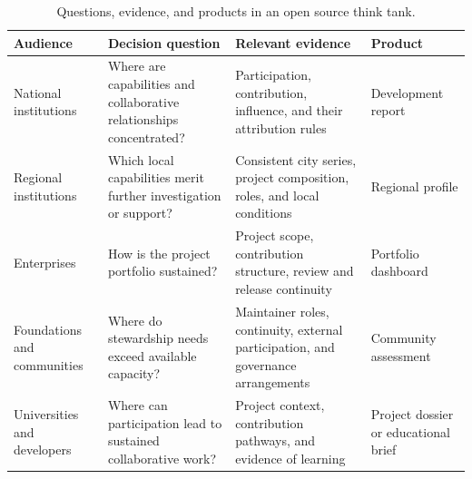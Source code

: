 \begin{table}[tbp]
\caption{Questions, evidence, and products in an open source think tank.}
\label{tab:ch10-audiences}
\centering\small\setlength{\tabcolsep}{4pt}\renewcommand{\arraystretch}{1.19}
\begin{tabularx}{\linewidth}{@{}>{\raggedright\arraybackslash}p{.15\linewidth}>{\raggedright\arraybackslash}p{.25\linewidth}>{\raggedright\arraybackslash}X>{\raggedright\arraybackslash}p{.18\linewidth}@{}}
\toprule
Audience & Decision question & Relevant evidence & Product \\
\midrule
National institutions & Where are capabilities and collaborative relationships concentrated? & Participation, contribution, influence, and their attribution rules & Development report \\
\addlinespace
Regional institutions & Which local capabilities merit further investigation or support? & Consistent city series, project composition, roles, and local conditions & Regional profile \\
\addlinespace
Enterprises & How is the project portfolio sustained? & Project scope, contribution structure, review and release continuity & Portfolio dashboard \\
\addlinespace
Foundations and communities & Where do stewardship needs exceed available capacity? & Maintainer roles, continuity, external participation, and governance arrangements & Community assessment \\
\addlinespace
Universities and developers & Where can participation lead to sustained collaborative work? & Project context, contribution pathways, and evidence of learning & Project dossier or educational brief \\
\bottomrule
\end{tabularx}
\end{table}

